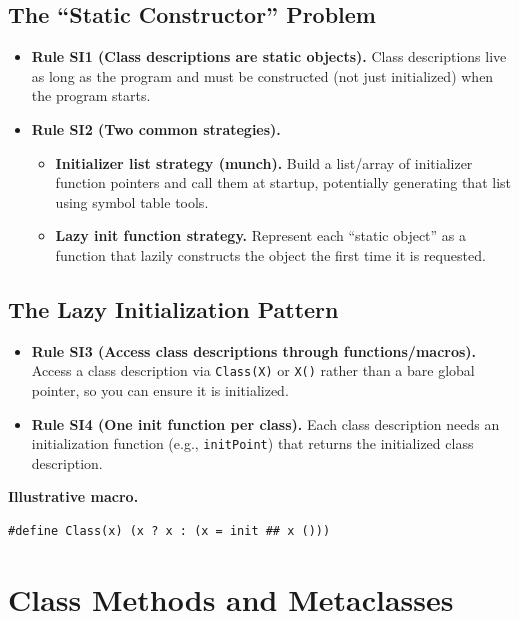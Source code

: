 \documentclass[11pt]{article}
\begin{document}
\subsection{The ``Static Constructor'' Problem}

\begin{itemize}
  \item \textbf{Rule SI1 (Class descriptions are static objects).} Class descriptions live as long as the program and must be constructed (not just initialized) when the program starts.
  \item \textbf{Rule SI2 (Two common strategies).}
  \begin{itemize}
    \item \textbf{Initializer list strategy (munch).} Build a list/array of initializer function pointers and call them at startup, potentially generating that list using symbol table tools.
    \item \textbf{Lazy init function strategy.} Represent each ``static object'' as a function that lazily constructs the object the first time it is requested.
  \end{itemize}
\end{itemize}

\subsection{The Lazy Initialization Pattern}

\begin{itemize}
  \item \textbf{Rule SI3 (Access class descriptions through functions/macros).} Access a class description via \texttt{Class(X)} or \texttt{X()} rather than a bare global pointer, so you can ensure it is initialized.
  \item \textbf{Rule SI4 (One init function per class).} Each class description needs an initialization function (e.g., \texttt{initPoint}) that returns the initialized class description.
\end{itemize}

\noindent\textbf{Illustrative macro.}
\begin{verbatim}
#define Class(x) (x ? x : (x = init ## x ()))
\end{verbatim}

\section{Class Methods and Metaclasses}
\end{document}
